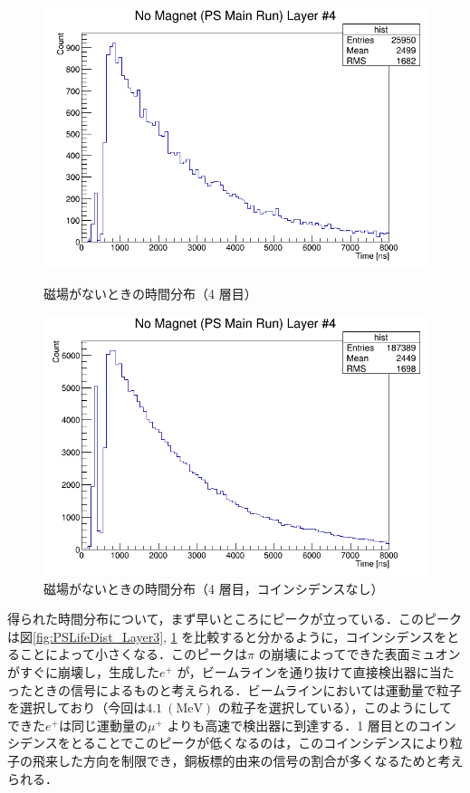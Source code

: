 \begin{figure}[h]
\begin{minipage}{0.45\textwidth}
	\includegraphics[width = \textwidth]{figure/odagawa/PSLifetimeDist_Layer3.png}
	\caption{磁場がないときの時間分布（4 層目）}
	\label{fig:PSLifeDist_Layer3}
	\end{minipage}
	\begin{minipage}{0.45\textwidth}
	\centering
	\includegraphics[width = \textwidth]{figure/odagawa/PSLifetimeDistNoCoin_Layer3.png}
	\caption{磁場がないときの時間分布（4 層目，コインシデンスなし）}
	\label{fig:PSLifeDistNoCoin_Layer3}
	\end{minipage}
\end{figure}%

得られた時間分布について，まず早いところにピークが立っている．このピークは図\ref{fig:PSLifeDist_Layer3}, \ref{fig:PSLifeDistNoCoin_Layer3} を比較すると分かるように，コインシデンスをとることによって小さくなる．このピークは$\pi$ の崩壊によってできた表面ミュオンがすぐに崩壊し，生成した$e^{+}$ が，ビームラインを通り抜けて直接検出器に当たったときの信号によるものと考えられる．ビームラインにおいては運動量で粒子を選択しており（今回は$4.1~(\mathrm{MeV})$ の粒子を選択している），このようにしてできた$e^{+}$は同じ運動量の$\mu^{+}$ よりも高速で検出器に到達する．1 層目とのコインシデンスをとることでこのピークが低くなるのは，このコインシデンスにより粒子の飛来した方向を制限でき，銅板標的由来の信号の割合が多くなるためと考えられる．

